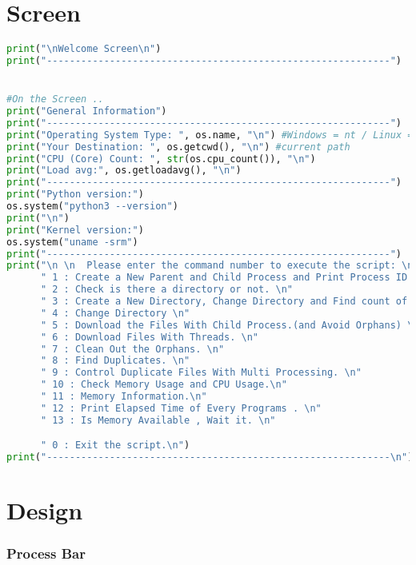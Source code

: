 \documentclass[onecolumn]{article}
\begin{document}
\section{Screen}
\begin{lstlisting}[language=Python, caption=Function and driver code for duplicate image finding]
print("\nWelcome Screen\n")
print("------------------------------------------------------------")


#On the Screen ..
print("General Information")
print("------------------------------------------------------------")
print("Operating System Type: ", os.name, "\n") #Windows = nt / Linux = posix
print("Your Destination: ", os.getcwd(), "\n") #current path
print("CPU (Core) Count: ", str(os.cpu_count()), "\n") 
print("Load avg:", os.getloadavg(), "\n")
print("------------------------------------------------------------")
print("Python version:")
os.system("python3 --version")
print("\n")
print("Kernel version:")
os.system("uname -srm")
print("------------------------------------------------------------")
print("\n \n  Please enter the command number to execute the script: \n"
      " 1 : Create a New Parent and Child Process and Print Process ID (PID). \n"
      " 2 : Check is there a directory or not. \n"
      " 3 : Create a New Directory, Change Directory and Find count of File in it. "
      " 4 : Change Directory \n"      
      " 5 : Download the Files With Child Process.(and Avoid Orphans) \n"
      " 6 : Download Files With Threads. \n"
      " 7 : Clean Out the Orphans. \n"
      " 8 : Find Duplicates. \n"
      " 9 : Control Duplicate Files With Multi Processing. \n"
      " 10 : Check Memory Usage and CPU Usage.\n"
      " 11 : Memory Information.\n"
      " 12 : Print Elapsed Time of Every Programs . \n"
      " 13 : Is Memory Available , Wait it. \n"

      " 0 : Exit the script.\n")
print("------------------------------------------------------------\n")

\end{lstlisting}




\section{Design}

\subsubsection{Process Bar}
\end{document}
